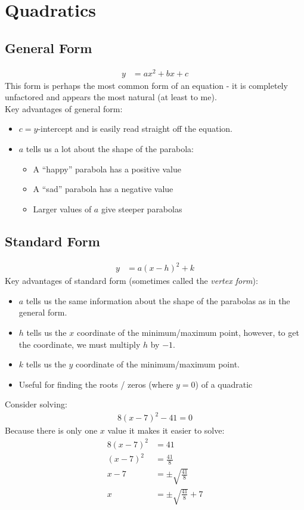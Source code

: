 \section{Quadratics}
\subsection{General Form}
\begin{align}
  y & = ax^2 + bx + c \nonumber
\end{align}
This form is perhaps the most common form of an equation - it is completely
unfactored and appears the most natural (at least to me).
\\
Key advantages of general form:
\begin{itemize}
  \item $c = y$-intercept and is easily read straight off the equation.
  \item $a$ tells us a lot about the shape of the parabola:
  \begin{itemize}
      \item A ``happy'' parabola has a positive value
      \item A ``sad'' parabola has a negative value
      \item Larger values of $a$ give steeper parabolas
  \end{itemize}
\end{itemize}

\subsection{Standard Form}
\begin{align}
  y & = a(x - h)^{2} + k \nonumber
\end{align}
Key advantages of standard form (sometimes called the \emph{vertex form}):
\begin{itemize}
  \item $a$ tells us the same information about the shape of the parabolas as in
  the general form.
  \item $h$ tells us the $x$ coordinate of the minimum/maximum point, however,
  to get the coordinate, we must multiply $h$ by $-1$.
  \item $k$ tells us the $y$ coordinate of the minimum/maximum point.
  \item Useful for finding the roots / zeros (where $y = 0$) of a quadratic
\end{itemize}
Consider solving:
\begin{align}
  8(x - 7)^{2} - 41 = 0
\end{align}
Because there is only one $x$ value it makes it easier to solve:
\begin{align}
  8(x - 7)^{2} & = 41 \\
  (x - 7)^{2}  & = \frac{41}{8} \\
  x - 7        & = \pm \sqrt{\frac{41}{8}} \\
  x            & = \pm \sqrt{\frac{41}{8}} + 7
\end{align}

